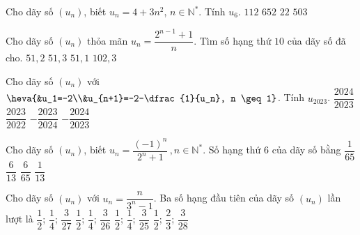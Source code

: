 \begin{ex}%
	Cho dãy số $(u_{n})$, biết $u_{n}=4+3n^2$, $n\in \mathbb{N}^*$. Tính  $u_{6}$.
	\choice 
		 {\True $112$}
		 {$652$}
		 {$22$}
		{$503$} 
\end{ex}

\begin{ex}%
	Cho dãy số $\left(u_{n} \right)$ thỏa mãn $u_{n} =\dfrac{2^{n-1} +1}{n} $. Tìm số hạng thứ $10$ của dãy  số đã cho.
	\choice 
		{$51{,}2$} 
		 {\True $51{,}3$}
		{$51{,}1$} 
		 {$102{,}3$}
\end{ex}

\begin{ex}%
	Cho dãy  số $(u_n)$ với $\heva{&u_1=-2\\&u_{n+1}=-2-\dfrac{1}{u_n}, n \geq 1}$. Tính $u_{2023}$.
	\choice 
		 {$\dfrac{2024}{2023}$}
		 {$\dfrac{2023}{2022}$}
		 {$-\dfrac{2023}{2024}$}
		{\True  $-\dfrac{2024}{2023}$}
\end{ex}

\begin{ex}%
	 Cho dãy số $(u_n)$, biết $u_n=\dfrac{(-1)^n}{2^n+1}\,, n\in \mathbb{N}^*$. Số hạng thứ $6$ của dãy số bằng
	\choice 
		{\True  $\dfrac{1}{65}$}
		 {$\dfrac{6}{13}$}
		{$\dfrac{6}{65}$} 
		{$\dfrac{1}{13}$} 
\end{ex}

\begin{ex}%
	Cho dãy  số $(u_n)$ với $u_n=\dfrac{n}{3^n-1}$. Ba số hạng đầu tiên của dãy số $(u_n)$ lần lượt là
	\choice 
		{$\dfrac{1}{2}$; $\dfrac{1}{4}$; $\dfrac{3}{27}$} 
		{\True $\dfrac{1}{2}$; $\dfrac{1}{4}$; $\dfrac{3}{26}$} 
		{$\dfrac{1}{2}$;  $\dfrac{1}{4}$; $\dfrac{3}{25}$}
		{$\dfrac{1}{2}$;  $\dfrac{2}{3}$; $\dfrac{3}{28}$}
\end{ex}

